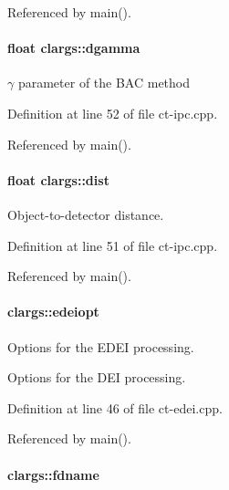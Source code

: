 Referenced by main().

\hypertarget{structclargs_aba257053a55cf9397cb83135e37030cb}{
\paragraph[{dgamma}]{\setlength{\rightskip}{0pt plus 5cm}float {\bf clargs::dgamma}}\hfill}
\label{structclargs_aba257053a55cf9397cb83135e37030cb}


$\gamma$ parameter of the BAC method 



Definition at line 52 of file ct-\/ipc.cpp.



Referenced by main().

\hypertarget{structclargs_a5e6a124c43d697e128d0fb7b3bfc3522}{
\paragraph[{dist}]{\setlength{\rightskip}{0pt plus 5cm}float {\bf clargs::dist}}\hfill}
\label{structclargs_a5e6a124c43d697e128d0fb7b3bfc3522}


Object-\/to-\/detector distance. 



Definition at line 51 of file ct-\/ipc.cpp.



Referenced by main().

\hypertarget{structclargs_aea1c39f22a21c69fbd90af6bcae1744d}{
\paragraph[{edeiopt}]{ {\bf clargs::edeiopt}}\hfill}
\label{structclargs_aea1c39f22a21c69fbd90af6bcae1744d}


Options for the EDEI processing. 

Options for the DEI processing. 

Definition at line 46 of file ct-\/edei.cpp.



Referenced by main().

\hypertarget{structclargs_a5bc2c64513cf2c0db294f527f4ecd8c1}{
\paragraph[{fdname}]{ {\bf clargs::fdname}}\hfill}
\label{structclargs_a5bc2c64513cf2c0db294f527f4ecd8c1}


